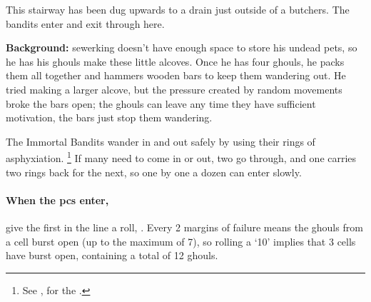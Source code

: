 
\label{butcher_exit}

This stairway has been dug upwards to a drain just outside of a butchers.
The bandits enter and exit through here.


\textbf{Background:}
\Gls{sewerking} doesn't have enough space to store his undead pets, so he has his ghouls make these little alcoves.
Once he has four ghouls, he packs them all together and hammers wooden bars to keep them wandering out.
He tried making a larger alcove, but the pressure created by random movements broke the bars open; the ghouls can leave any time they have sufficient motivation, the bars just stop them wandering.

The Immortal Bandits wander in and out safely by using their rings of asphyxiation.%
\footnote{See , for the .}
If many need to come in or out, two go through, and one carries two rings back for the next, so one by one a dozen can enter slowly.

\paragraph{When the \glspl{pc} enter,}
give the first in the line a  roll, \tn[16].
Every 2 margins of failure means the ghouls from a cell burst open (up to the maximum of 7), so rolling a `10' implies that 3 cells have burst open, containing a total of 12 ghouls.

